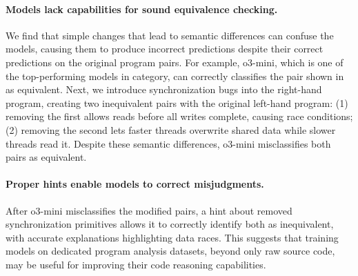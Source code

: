 \paragraph{Models lack capabilities for sound equivalence checking.} We find that simple changes that lead to semantic differences can confuse the models, causing them to produce incorrect predictions despite their correct predictions on the original program pairs. For example, o3-mini, which is one of the top-performing models in \cuda category, can correctly classifies the pair shown in  as equivalent. Next, we introduce synchronization bugs into the right-hand program, creating two inequivalent pairs with the original left-hand program: (1) removing the first  allows reads before all writes complete, causing race conditions; (2) removing the second  lets faster threads overwrite shared data while slower threads read it. Despite these semantic differences, o3-mini misclassifies both pairs as equivalent.

\paragraph{Proper hints enable models to correct misjudgments.} After o3-mini misclassifies the modified pairs, a hint about removed synchronization primitives allows it to correctly identify both as inequivalent, with accurate explanations highlighting data races. This suggests that training models on dedicated program analysis datasets, beyond only raw source code, may be useful for improving their code reasoning capabilities.